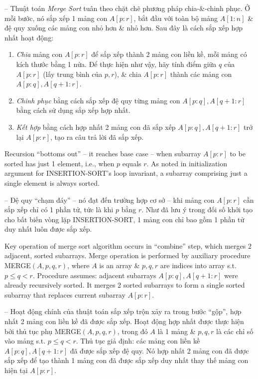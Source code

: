 \documentclass{article}
\begin{document}
\begin{itemize}
\begin{itemize}
\begin{itemize}
\begin{itemize}
                -- Thuật toán {\it Merge Sort} tuân theo chặt chẽ phương pháp chia-\&-chinh phục. Ở mỗi bước, nó sắp xếp 1 mảng con $A[p:r]$, bắt đầu với toàn bộ mảng $A[1:n]$ \& đệ quy xuống các mảng con nhỏ hơn \& nhỏ hơn. Sau đây là cách sắp xếp hợp nhất hoạt động:
                \begin{enumerate}
                    \item {\it Chia} mảng con $A[p:r]$ để sắp xếp thành 2 mảng con liền kề, mỗi mảng có kích thước bằng 1 nửa. Để thực hiện như vậy, hãy tính điểm giữa $q$ của $A[p:r]$ (lấy trung bình của $p,r$), \& chia $A[p:r]$ thành các mảng con $A[p:q],A[q + 1:r]$.
                    \item {\it Chinh phục} bằng cách sắp xếp đệ quy từng mảng con $A[p:q],A[q + 1:r]$ bằng cách sử dụng sắp xếp hợp nhất.
                    \item {\it Kết hợp} bằng cách hợp nhất 2 mảng con đã sắp xếp $A[p:q],A[q + 1:r]$ trở lại $A[p:r]$, tạo ra câu trả lời đã sắp xếp.
                \end{enumerate}
                Recursion ``bottoms out'' -- it reaches base case -- when subarray $A[p:r]$ to be sorted has just 1 element, i.e., when $p$ equals $r$. As noted in initialization argument for INSERTION-SORT's loop invariant, a subarray comprising just a single element is always sorted.
                
                -- Đệ quy ``chạm đáy'' -- nó đạt đến trường hợp cơ sở -- khi mảng con $A[p:r]$ cần sắp xếp chỉ có 1 phần tử, tức là khi $p$ bằng $r$. Như đã lưu ý trong đối số khởi tạo cho bất biến vòng lặp INSERTION-SORT, 1 mảng con chỉ bao gồm 1 phần tử duy nhất luôn được sắp xếp.
                
                Key operation of merge sort algorithm occurs in ``combine'' step, which merges 2 adjacent, sorted subarrays. Merge operation is performed by auxiliary procedure MERGE$(A,p,q,r)$, where $A$ is an array \& $p,q,r$ are indices into array s.t. $p\le q < r$. Procedure assumes: adjacent subarrays $A[p:q],A[q + 1:r]$ were already recursively sorted. It merges 2 sorted subarrays to form a single sorted subarray that replaces current subarray $A[p:r]$.
                
                -- Hoạt động chính của thuật toán sắp xếp trộn xảy ra trong bước ``gộp'', hợp nhất 2 mảng con liền kề đã được sắp xếp. Hoạt động hợp nhất được thực hiện bởi thủ tục phụ MERGE$(A,p,q,r)$, trong đó $A$ là 1 mảng \& $p,q,r$ là các chỉ số vào mảng s.t. $p\le q < r$. Thủ tục giả định: các mảng con liền kề $A[p:q],A[q + 1:r]$ đã được sắp xếp đệ quy. Nó hợp nhất 2 mảng con đã được sắp xếp để tạo thành 1 mảng con đã được sắp xếp duy nhất thay thế mảng con hiện tại $A[p:r]$.
                

\end{itemize}
\end{itemize}
\end{itemize}
\end{itemize}
\end{document}
